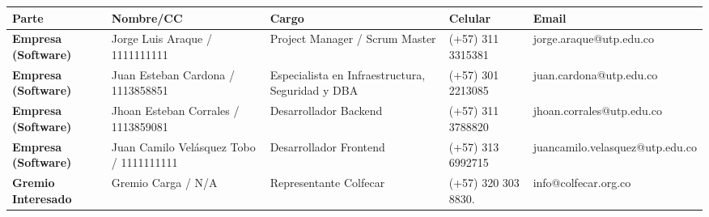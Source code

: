 \begin{table}[H]
\footnotesize
\centering
\begin{tabulary}{\textwidth}{@{}LLLLL@{}}
\toprule
\textbf{Parte} & \textbf{Nombre/CC} & \textbf{Cargo} & \textbf{Celular} & \textbf{Email} \\ \midrule
\textbf{Empresa (Software)} & Jorge Luis Araque / 1111111111 & Project Manager / Scrum Master & (+57) 311 3315381 & jorge.araque@utp.edu.co \\
\textbf{Empresa (Software)} & Juan Esteban Cardona / 1113858851 & Especialista en Infraestructura, Seguridad y DBA & (+57) 301 2213085 & juan.cardona@utp.edu.co \\
\textbf{Empresa (Software)} & Jhoan Esteban Corrales / 1113859081 & Desarrollador Backend & (+57) 311 3788820 & jhoan.corrales@utp.edu.co \\
\textbf{Empresa (Software)} & Juan Camilo Velásquez Tobo / 1111111111 & Desarrollador Frontend & (+57) 313 6992715 & juancamilo.velasquez@utp.edu.co \\
\textbf{Gremio Interesado} & Gremio Carga / N/A & Representante Colfecar & (+57) 320 303 8830. & info@colfecar.org.co \\ \bottomrule
\end{tabulary}
\end{table}